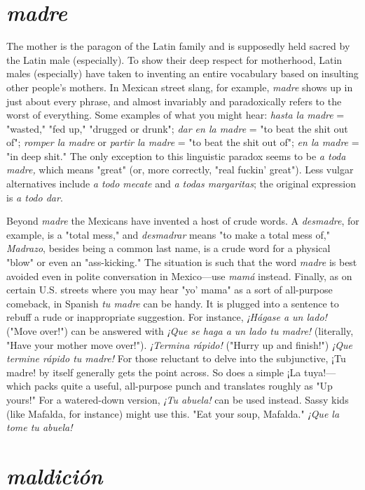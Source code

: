 \section{\emph{madre}}

The mother is the paragon of the Latin family and is supposedly held sacred by the Latin male (especially). To show their deep respect for motherhood, Latin males (especially) have taken to inventing an entire vocabulary based on insulting other people's mothers. In
Mexican street slang, for example, \emph{madre} shows up in just about every
phrase, and almost invariably and paradoxically refers to the worst of
everything. Some examples of what you might hear: \emph{hasta la madre} =
"wasted," "fed up," "drugged or drunk"; \emph{dar en la madre} = "to beat
the shit out of"; \emph{romper la madre} or \emph{partir la madre} = "to beat the
shit out of"; \emph{en la madre} = "in deep shit." The only exception to this
linguistic paradox seems to be \emph{a toda madre,} which means "great" (or,
more correctly, "real fuckin' great"). Less vulgar alternatives include
\emph{a todo mecate} and \emph{a todas margaritas}; the original expression is \emph{a todo dar}.

Beyond \emph{madre} the Mexicans have invented a host of crude
words. A \emph{desmadre}, for example, is a "total mess," and \emph{desmadrar}
means "to make a total mess of," \emph{Madrazo}, besides being a common
last name, is a crude word for a physical "blow" or even an "ass-kicking." The situation is such that the word \emph{madre} is best avoided
even in polite conversation in Mexico---use \emph{mamá} instead. Finally, as
on certain U.S. streets where you may hear "yo' mama" as a sort of all-purpose comeback, in Spanish \emph{tu madre} can be handy. It is plugged
into a sentence to rebuff a rude or inappropriate suggestion. For instance, \emph{¡Hágase a un lado!} ("Move over!") can be answered with \emph{¡Que
se haga a un lado tu madre!} (literally, "Have your mother move over!").
\emph{¡Termina rápido!} ("Hurry up and finish!") \emph{¡Que termine rápido tu
madre!} For those reluctant to delve into the subjunctive, ¡Tu madre!
by itself generally gets the point across. So does a simple ¡La tuya!--- which packs quite a useful, all-purpose punch and translates roughly
as "Up yours!" For a watered-down version, \emph{¡Tu abuela!} can be used
instead. Sassy kids (like Mafalda, for instance) might use this. "Eat
your soup, Mafalda." \emph{¡Que la tome tu abuela!}

\section{\emph{maldición}}

